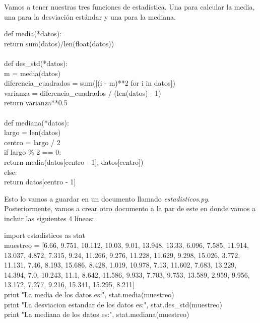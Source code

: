 \documentclass[10pt,letterpaper]{article}
\newenvironment{Code}
{
\begin{lrbox}{\selvestebox}%
\begin{minipage}{\dimexpr\columnwidth-2\fboxsep\relax}
\fontfamily{\ttdefault}\selectfont
}
{\end{minipage}\end{lrbox}%
\begin{center}
\colorbox{light-gray}{\usebox{\selvestebox}}
\end{center}
}
\begin{document}
Vamos a tener nuestras tres funciones de estad\'istica. Una para calcular la media, una para la desviaci\'on est\'andar y una para la mediana.

\begin{Code}
def media(*datos):\\
\hspace*{6mm} return sum(datos)/len(float(datos))\\
\ \\
def des\_std(*datos):\\
\hspace*{6mm} m = media(datos)\\
\hspace*{6mm} diferencia\_cuadrados = sum([(i - m)**2 for i in datos])\\
\hspace*{6mm} varianza = diferencia\_cuadrados / (len(datos) - 1)\\
\hspace*{6mm} return varianza**0.5\\
\ \\
def mediana(*datos):\\
\hspace*{6mm} largo = len(datos)\\
\hspace*{6mm} centro = largo / 2\\
\hspace*{6mm} if largo \% 2 == 0:\\
\hspace*{13mm} return media(datos[centro - 1], datos[centro])\\
\hspace*{6mm} else:\\
\hspace*{13mm} return datos[centro - 1]
\end{Code}

Esto lo vamos a guardar en un documento llamado \emph{estadisticos.py}. Posteriormente, vamos a crear otro documento a la par de este en donde vamos a incluir las siguientes 4 l\'ineas:

\begin{Code}
import estadisticos as stat\\
muestreo = [6.66, 9.751, 10.112, 10.03, 9.01, 13.948, 13.33, 6.096, 7.585, 11.914, 13.037, 4.872, 7.315, 9.24, 11.266, 9.276, 11.228, 11.629, 9.298, 15.026, 3.772, 11.131, 7.46, 8.193, 15.686, 8.428, 1.019, 10.978, 7.13, 11.602, 7.683, 13.229, 14.394, 7.0, 10.243, 11.1, 8.642, 11.586, 9.933, 7.703, 9.753, 13.589, 2.959, 9.956, 13.172, 7.277, 9.216, 15.341, 15.295, 8.211]\\
print "La media de los datos es:", stat.media(muestreo)\\
print "La desviacion estandar de los datos es:", stat.des\_std(muestreo)\\
print "La mediana de los datos es:", stat.mediana(muestreo)\\
\end{Code}
\end{document}
